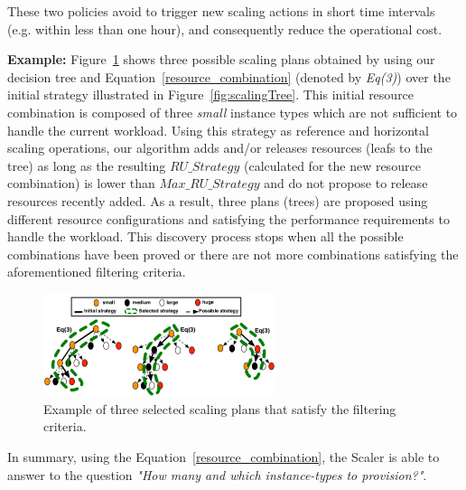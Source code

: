 These two policies avoid to trigger new scaling actions in short time intervals (e.g. within less than one hour), and consequently reduce the operational cost. 


\noindent\textbf{Example:} Figure~\ref{fig:scalingTreeSelection} shows three possible scaling plans obtained by using our decision tree and Equation~\ref{resource_combination} (denoted by \emph{Eq(3)}) over the initial strategy illustrated in Figure~\ref{fig:scalingTree}. This initial resource combination is composed of three \emph{small} instance types which are not sufficient to handle the current workload. Using this strategy as reference and horizontal scaling operations, our algorithm adds and/or releases resources (leafs to the tree) as long as the resulting \emph{$RU\_Strategy$} (calculated for the new resource combination) is lower than \emph{$Max\_RU\_Strategy$} and do not propose to release resources recently added. As a result, three plans (trees) are proposed using different resource configurations and satisfying the performance requirements to handle the workload. This discovery process stops when all the possible combinations have been proved or there are not more combinations satisfying the aforementioned filtering criteria. 



\begin{figure}[t]
  \begin{center}
    \includegraphics[width=0.7\linewidth,height=3cm]{images/optimalTree_selection}
  \end{center}
\vspace{-4mm}
  \caption{Example of three selected scaling plans that satisfy the filtering criteria.}
  \label{fig:scalingTreeSelection}
\end{figure}



In summary, using the Equation~\ref{resource_combination}, the Scaler is able to answer to the question \emph{"How many and which instance-types to provision?"}.


